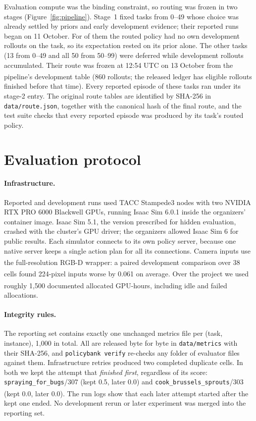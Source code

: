 \documentclass[10pt]{article}
\newcommand{\code}[1]{\texttt{#1}}
\newcommand{\pl}{\textsuperscript{\dag}}
\begin{document}
Evaluation compute was the binding constraint, so routing was frozen in two stages (Figure~\ref{fig:pipeline}). Stage~1 fixed \StageOneTasks{} tasks from 0--49 whose choice was already settled by priors and early development evidence; their reported runs began on 11 October. For \StageOneZeroOwn{} of them the routed policy had no own development rollouts on the task, so its expectation rested on its prior alone. The other \StageTwoTasks{} tasks (13 from 0--49 and all 50 from 50--99) were deferred while development rollouts accumulated. Their route was frozen at 12:54 UTC on 13 October from the pipeline's development table (860\pl{} rollouts; the released ledger has \DevAtFreeze{} eligible rollouts finished before that time). Every reported episode of these tasks ran under its stage-2 entry. The original route tables are identified by SHA-256 in \code{data/route.json}, together with the canonical hash of the final route, and the test suite checks that every reported episode was produced by its task's routed policy.

\section{Evaluation protocol}
\label{sec:protocol}

\paragraph{Infrastructure.} Reported and development runs used TACC Stampede3 nodes with two NVIDIA RTX PRO 6000 Blackwell GPUs, running Isaac Sim 6.0.1 inside the organizers' container image. Isaac Sim 5.1, the version prescribed for hidden evaluation, crashed with the cluster's GPU driver; the organizers allowed Isaac Sim 6 for public results. Each simulator connects to its own policy server, because one native server keeps a single action plan for all its connections. Camera inputs use the full-resolution RGB-D wrapper: a paired development comparison over 38\pl{} cells found 224-pixel inputs worse by 0.061\pl{} on average. Over the project we used roughly 1,500\pl{} documented allocated GPU-hours, including idle and failed allocations.

\paragraph{Integrity rules.} The reporting set contains exactly one unchanged metrics file per (task, instance), 1,000 in total. All are released byte for byte in \code{data/metrics} with their SHA-256, and \code{policybank verify} re-checks any folder of evaluator files against them. Infrastructure retries produced two completed duplicate cells. In both we kept the attempt that \emph{finished first}, regardless of its score: \code{spraying\_for\_bugs}/307 (kept 0.5, later 0.0) and \code{cook\_brussels\_sprouts}/303 (kept 0.0, later 0.0). The run logs\pl{} show that each later attempt started after the kept one ended. No development rerun or later experiment was merged into the reporting set.
\end{document}
